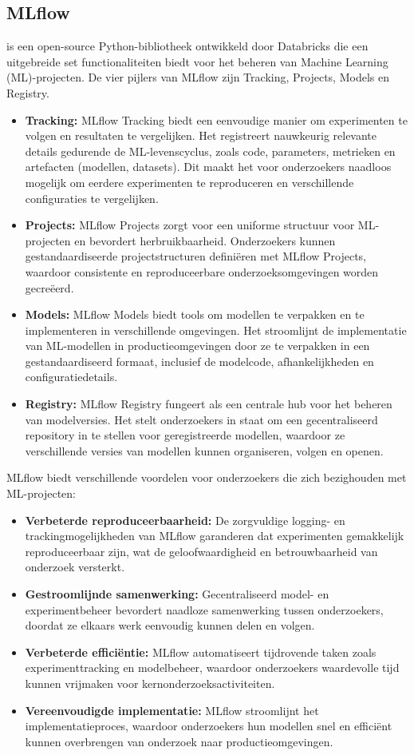 \subsection{MLflow}
\autocite{MLflow2023} is een open-source Python-bibliotheek ontwikkeld door Databricks die een uitgebreide set functionaliteiten biedt voor het beheren van Machine Learning (ML)-projecten. De vier pijlers van MLflow zijn Tracking, Projects, Models en Registry.
\begin{itemize}
    \item \textbf{Tracking:} MLflow Tracking biedt een eenvoudige manier om experimenten te volgen en resultaten te vergelijken. Het registreert nauwkeurig relevante details gedurende de ML-levenscyclus, zoals code, parameters, metrieken en artefacten (modellen, datasets). Dit maakt het voor onderzoekers naadloos mogelijk om eerdere experimenten te reproduceren en verschillende configuraties te vergelijken.
    \item \textbf{Projects:} MLflow Projects zorgt voor een uniforme structuur voor ML-projecten en bevordert herbruikbaarheid. Onderzoekers kunnen gestandaardiseerde projectstructuren definiëren met MLflow Projects, waardoor consistente en reproduceerbare onderzoeksomgevingen worden gecreëerd.
    \item \textbf{Models:} MLflow Models biedt tools om modellen te verpakken en te implementeren in verschillende omgevingen. Het stroomlijnt de implementatie van ML-modellen in productieomgevingen door ze te verpakken in een gestandaardiseerd formaat, inclusief de modelcode, afhankelijkheden en configuratiedetails.
    \item \textbf{Registry:} MLflow Registry fungeert als een centrale hub voor het beheren van modelversies. Het stelt onderzoekers in staat om een gecentraliseerd repository in te stellen voor geregistreerde modellen, waardoor ze verschillende versies van modellen kunnen organiseren, volgen en openen.
\end{itemize}
MLflow biedt verschillende voordelen voor onderzoekers die zich bezighouden met ML-projecten:
\begin{itemize}
    \item \textbf{Verbeterde reproduceerbaarheid:} De zorgvuldige logging- en trackingmogelijkheden van MLflow garanderen dat experimenten gemakkelijk reproduceerbaar zijn, wat de geloofwaardigheid en betrouwbaarheid van onderzoek versterkt.
    \item \textbf{Gestroomlijnde samenwerking:} Gecentraliseerd model- en experimentbeheer bevordert naadloze samenwerking tussen onderzoekers, doordat ze elkaars werk eenvoudig kunnen delen en volgen.
    \item \textbf{Verbeterde efficiëntie:} MLflow automatiseert tijdrovende taken zoals experimenttracking en modelbeheer, waardoor onderzoekers waardevolle tijd kunnen vrijmaken voor kernonderzoeksactiviteiten.
    \item \textbf{Vereenvoudigde implementatie:} MLflow stroomlijnt het implementatieproces, waardoor onderzoekers hun modellen snel en efficiënt kunnen overbrengen van onderzoek naar productieomgevingen.
\end{itemize}
